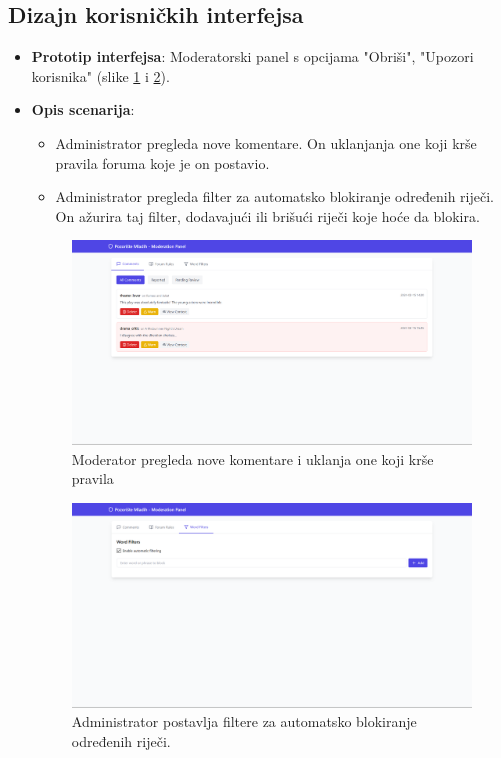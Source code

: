 \subsection{Dizajn korisničkih interfejsa}  
\begin{itemize}  
    \item \textbf{Prototip interfejsa}: Moderatorski panel s opcijama "Obriši", "Upozori korisnika" (slike \ref{fig:fz9_1} i \ref{fig:fz9_2}).  
    \item \textbf{Opis scenarija}:  
    \begin{itemize}  
            \item Administrator pregleda nove komentare. On uklanjanja one koji krše pravila foruma koje je on postavio. 
            \item Administrator pregleda filter za automatsko blokiranje određenih riječi. On ažurira taj filter, dodavajući ili brišući riječi koje hoće da blokira.  
        \end{itemize}  
    \begin{figure}[H]
        \centering
        \includegraphics[width=1\linewidth]{Slike/FZ9/fz9_1.png}
        \caption{Moderator pregleda nove komentare i uklanja one koji krše pravila}
        \label{fig:fz9_1}
    \end{figure}
    \begin{figure}[H]
        \centering
        \includegraphics[width=1\linewidth]{Slike/FZ9/fz9_2.png}
        \caption{Administrator postavlja filtere za automatsko blokiranje određenih riječi.}
        \label{fig:fz9_2}
    \end{figure}
\end{itemize}  

